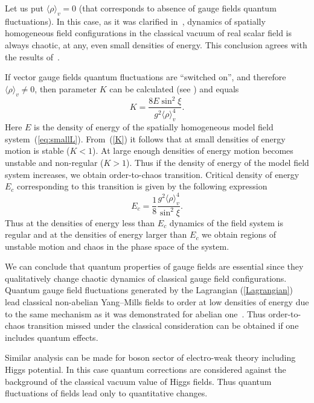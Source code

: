 \documentclass[a4paper,12pt]{article}
\begin{document}
Let us put $\langle \rho\rangle_{v}=0$ (that corresponds to absence of gauge fields
quantum fluctuations). In this case, as it was clarified in~\cite{Savvidy}, dynamics
of spatially homogeneous field configurations in the classical vacuum of real scalar
field is always chaotic, at any, even small densities of energy. This conclusion
agrees with the results of~\cite{regular, Salasnich, we3}.


If vector gauge fields quantum fluctuations are ``switched on'', and therefore
$\langle \rho\rangle_{v} \neq 0$, then parameter $K$ can be calculated (see
\cite{we3}) and equals
\begin{equation}\label{K}
  K=\frac{8E\sin^{2}{\xi}}{g^{2}\langle \rho\rangle_{v}^{4}}.
\end{equation}
Here $E$ is the density of energy of the spatially homogeneous model field
system~(\ref{eq:smallL}). From~(\ref{K}) it follows that at small densities of energy
motion is stable ($K<1$). At large enough densities of energy motion becomes unstable
and non-regular ($K>1$). Thus if the density of energy of the model field system
increases, we obtain order-to-chaos transition. Critical density of energy $E_{c}$
corresponding to this transition is given by the following expression
\begin{equation*} %
E_{c}=\frac{1}{8}\frac{g^{2}\langle \rho\rangle_{v}^{4}}{\sin^{2}{\xi}}.
\end{equation*}
Thus at the densities of energy less than $E_{c}$ dynamics of the field system is
regular and at the densities of energy larger than $E_{c}$ we obtain regions of
unstable motion and chaos in the phase space of the system.

We can conclude that quantum properties of gauge fields are essential since they
quali\-tatively change chaotic dynamics of classical gauge field configurations.
Quantum gauge field fluctuations generated by the Lagrangian (\ref{Lagrangian}) lead
classical non-abelian Yang--Mills fields to order at low densities of energy due to
the same mechanism as it was demonstrated for abelian one~\cite{1997}. Thus
order-to-chaos transition missed under the classical consideration can be obtained if
one includes quantum effects.

Similar analysis can be made for boson sector of electro-weak theory including Higgs
potential. In this case quantum corrections are considered against the background of
the classical vacuum value of Higgs fields. Thus quantum fluctuations of fields lead
only to quantitative changes.
\end{document}

